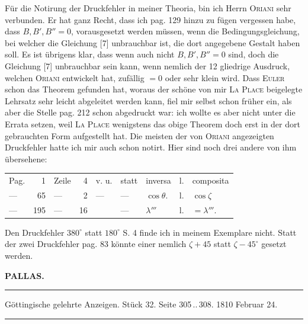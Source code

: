 \par\indent Für die Notirung der Druckfehler in meiner Theoria, bin ich Herrn \textsc{Oriani} sehr verbunden. Er hat ganz Recht, dass ich pag. 129 hinzu zu fügen vergessen habe, dass $B, B', B'' = 0$, vorausgesetzt
werden müssen, wenn die Bedingungsgleichung, bei welcher die Gleichung [7] unbrauchbar ist, die dort angegebene Gestalt haben soll. Es ist übrigens klar, dass wenn auch nicht $B, B', B''=0$ sind, doch die Gleichung [7] unbrauchbar sein kann, wenn nemlich  der 12 gliedrige Ausdruck, welchen \textsc{Oriani} entwickelt hat, zufällig $=0$ oder sehr klein wird. Dass \textsc{Euler} schon das Theorem gefunden hat, woraus der schöne von mir \textsc{La Place} beigelegte Lehrsatz sehr leicht abgeleitet werden kann, fiel mir selbst schon früher ein, als aber die Stelle pag. 212 schon abgedruckt war: ich wollte es aber nicht unter die Errata setzen, weil \textsc{La Place} wenigstens das obige Theorem doch erst in der dort gebrauchten Form aufgestellt hat. Die meisten der von \textsc{Oriani} angezeigten Druckfehler hatte ich mir auch schon notirt. Hier sind noch drei andere von ihm übersehene:

\begin{center}\fontsize{10}{12}\selectfont\setlength{\tabcolsep}{5pt}\renewcommand{\arraystretch}{1.15}\begin{tabular}{lrlrlllll}
Pag. & 1 & Zeile & 4 & v. u. & statt & inversa & l. & composita\\
--- & 65 & --- & 2 & --- & --- & $\cos\theta$. & l. & $\cos\zeta$\\
--- & 195 & --- & 16 &  & --- & $\lambda'''$ & l. & $=\lambda'''$.\\
\end{tabular}\end{center}

\par\indent Den Druckfehler $380^\circ$ statt $180^\circ$ S. 4 finde ich in meinem Exemplare nicht. Statt der zwei Druckfehler pag. 83 könnte einer nemlich $\zeta+45$ statt $\zeta-45^\circ$ gesetzt werden.
\clearpage{}

\begin{center}\textbf{PALLAS.}\par\vspace{4pt}\hrule\vspace{4pt}\fontsize{10}{12}\selectfont Göttingische gelehrte Anzeigen. Stück 32. Seite 305\,..\,308. 1810 Februar 24.\par\vspace{4pt}\hrule\vspace{4pt}\end{center}

